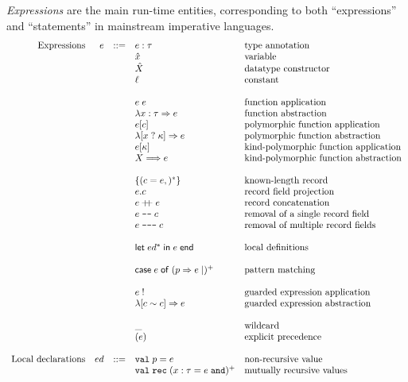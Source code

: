 \documentclass{article}
\newcommand{\cd}[1]{\texttt{#1}}
\newcommand{\mt}[1]{\mathsf{#1}}
\newcommand{\rc}{+ \hspace{-.075in} + \;}
\newcommand{\rcut}{\; \texttt{-{}-} \;}
\newcommand{\rcutM}{\; \texttt{-{}-{}-} \;}
\begin{document}
\emph{Expressions} are the main run-time entities, corresponding to both ``expressions'' and ``statements'' in mainstream imperative languages.
$$\begin{array}{rrcll}
  \textrm{Expressions} & e &::=& e : \tau & \textrm{type annotation} \\
  &&& \hat{x} & \textrm{variable} \\
  &&& \hat{X} & \textrm{datatype constructor} \\
  &&& \ell & \textrm{constant} \\
  \\
  &&& e \; e & \textrm{function application} \\
  &&& \lambda x : \tau \Rightarrow e & \textrm{function abstraction} \\
  &&& e [c] & \textrm{polymorphic function application} \\
  &&& \lambda [x \; ? \; \kappa] \Rightarrow e & \textrm{polymorphic function abstraction} \\
  &&& e [\kappa] & \textrm{kind-polymorphic function application} \\
  &&& X \Longrightarrow e & \textrm{kind-polymorphic function abstraction} \\
  \\
  &&& \{(c = e,)^*\} & \textrm{known-length record} \\
  &&& e.c & \textrm{record field projection} \\
  &&& e \rc e & \textrm{record concatenation} \\
  &&& e \rcut c & \textrm{removal of a single record field} \\
  &&& e \rcutM c & \textrm{removal of multiple record fields} \\
  \\
  &&& \mt{let} \; ed^* \; \mt{in} \; e \; \mt{end} & \textrm{local definitions} \\
  \\
  &&& \mt{case} \; e \; \mt{of} \; (p \Rightarrow e\mid)^+ & \textrm{pattern matching} \\
  \\
  &&& e \; ! & \textrm{guarded expression application} \\
  &&& \lambda [c \sim c] \Rightarrow e & \textrm{guarded expression abstraction} \\
  \\
  &&& \_ & \textrm{wildcard} \\
  &&& (e) & \textrm{explicit precedence} \\
  \\
  \textrm{Local declarations} & ed &::=& \cd{val} \; p = e & \textrm{non-recursive value} \\
  &&& \cd{val} \; \cd{rec} \; (x : \tau = e \; \cd{and})^+ & \textrm{mutually recursive values} \\
\end{array}$$
\end{document}
